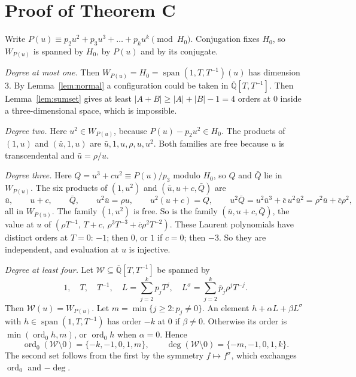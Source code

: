 \documentclass[11pt,a4paper]{article}
\theoremstyle{plain}
\theoremstyle{definition}
\newcommand{\Qbar}{\overline{\mathbb{Q}}}
\newcommand{\ord}{\operatorname{ord}}
\newcommand{\spn}{\operatorname{span}}
\begin{document}
\section{Proof of Theorem C}\label{sec:proofC}

Write $P(u)\equiv p_{2}u^{2}+p_{3}u^{3}+\dots+p_{k}u^{k}\pmod{H_{0}}$. Conjugation fixes
$H_{0}$, so $W_{P(u)}$ is spanned by $H_{0}$, by $P(u)$ and by its conjugate.

\emph{Degree at most one.} Then $W_{P(u)}=H_{0}=\spn(1,T,T^{-1})(u)$ has dimension $3$.
By Lemma~\ref{lem:normal} a configuration could be taken in $\Qbar[T,T^{-1}]$. Then
Lemma~\ref{lem:sumset} gives at least $|A+B|\ge|A|+|B|-1=4$ orders at $0$ inside a
three-dimensional space, which is impossible.

\emph{Degree two.} Here $u^{2}\in W_{P(u)}$, because $P(u)-p_{2}u^{2}\in H_{0}$. The
products of $(1,u)$ and $(\bar u,1,u)$ are $\bar u,1,u,\rho,u,u^{2}$. Both families are free
because $u$ is transcendental and $\bar u=\rho/u$.

\emph{Degree three.} Here $Q=u^{3}+cu^{2}\equiv P(u)/p_{3}$ modulo $H_{0}$, so $Q$ and
$\bar Q$ lie in $W_{P(u)}$. The six products of $(1,u^{2})$ and $(\bar u,u+c,\bar Q)$ are
\[
  \bar u,\qquad u+c,\qquad \bar Q,\qquad u^{2}\bar u=\rho u,\qquad u^{2}(u+c)=Q,\qquad
  u^{2}\bar Q=u^{2}\bar u^{3}+\bar c\,u^{2}\bar u^{2}=\rho^{2}\bar u+\bar c\rho^{2},
\]
all in $W_{P(u)}$. The family $(1,u^{2})$ is free. So is the family
$(\bar u,u+c,\bar Q)$, the value at $u$ of $(\rho T^{-1},\,T+c,\,\rho^{3}T^{-3}+\bar c\rho^{2}T^{-2})$.
These Laurent polynomials have distinct orders at $T=0$: $-1$; then $0$, or $1$ if $c=0$;
then $-3$. So they are independent, and evaluation at $u$ is injective.

\emph{Degree at least four.} Let $\mathcal W\subseteq\Qbar[T,T^{-1}]$ be spanned by
\[
  1,\quad T,\quad T^{-1},\quad L=\sum_{j=2}^{k}p_{j}T^{j},\quad
  L^{\sigma}=\sum_{j=2}^{k}\bar p_{j}\rho^{j}T^{-j}.
\]
Then $\mathcal W(u)=W_{P(u)}$. Let $m=\min\{j\ge2:p_{j}\neq0\}$. An element
$h+\alpha L+\beta L^{\sigma}$ with $h\in\spn(1,T,T^{-1})$ has order $-k$ at $0$ if
$\beta\neq0$. Otherwise its order is $\min(\ord_{0}h,m)$, or $\ord_{0}h$ when
$\alpha=0$. Hence
\[
  \ord_{0}(\mathcal W\setminus0)=\{-k,-1,0,1,m\},\qquad
  \deg(\mathcal W\setminus0)=\{-m,-1,0,1,k\}.
\]
The second set follows from the first by the symmetry $f\mapsto f^{\sigma}$, which
exchanges $\ord_{0}$ and $-\deg$.
\end{document}
